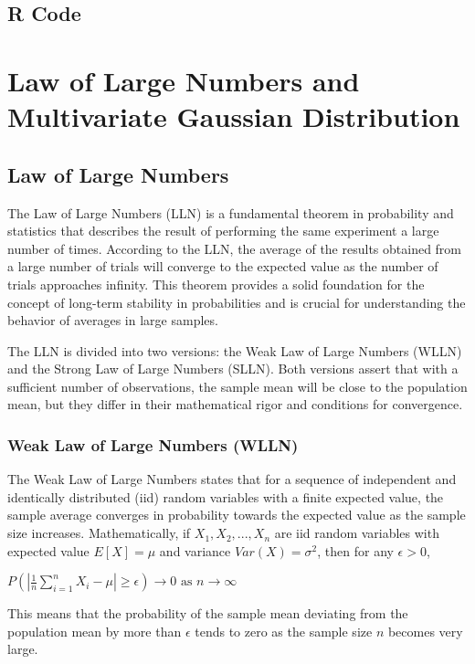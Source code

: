 \documentclass{article}
\begin{document}
\subsection{R Code}

\section{Law of Large Numbers and Multivariate Gaussian Distribution}

\subsection{Law of Large Numbers}

The Law of Large Numbers (LLN) is a fundamental theorem in probability and statistics that describes the result of performing the same experiment a large number of times. According to the LLN, the average of the results obtained from a large number of trials will converge to the expected value as the number of trials approaches infinity. This theorem provides a solid foundation for the concept of long-term stability in probabilities and is crucial for understanding the behavior of averages in large samples.

The LLN is divided into two versions: the Weak Law of Large Numbers (WLLN) and the Strong Law of Large Numbers (SLLN). Both versions assert that with a sufficient number of observations, the sample mean will be close to the population mean, but they differ in their mathematical rigor and conditions for convergence.

\subsubsection{Weak Law of Large Numbers (WLLN)}

The Weak Law of Large Numbers states that for a sequence of independent and identically distributed (iid) random variables with a finite expected value, the sample average converges in probability towards the expected value as the sample size increases. Mathematically, if $X_1,X_2,...,X_n$ are iid random variables with expected value $E[X]=\mu$ and variance $Var(X)=\sigma^2$, then for any $\epsilon > 0$,

$P(|\frac {1} {n} \sum_{i=1}^{n} X_i- \mu| \geq \epsilon) \rightarrow 0 \text{ as } n \rightarrow \infty$

This means that the probability of the sample mean deviating from the population mean by more than $\epsilon$ tends to zero as the sample size $n$ becomes very large.
\end{document}
